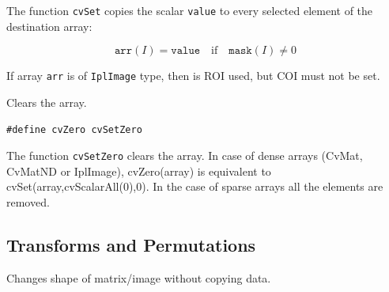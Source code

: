 \begin{description}
\end{description}


The function \texttt{cvSet} copies the scalar \texttt{value} to every selected element of the destination array:

\[
\texttt{arr}(I)=\texttt{value} \quad \text{if} \quad \texttt{mask}(I) \ne 0
\]

If array \texttt{arr} is of \texttt{IplImage} type, then is ROI used, but COI must not be set.

\label{SetZero}

Clears the array.


\begin{lstlisting}
#define cvZero cvSetZero
\end{lstlisting}

\begin{description}
\end{description}

The function \texttt{cvSetZero} clears the array. In case of dense arrays (CvMat, CvMatND or IplImage), cvZero(array) is equivalent to
cvSet(array,cvScalarAll(0),0).
In the case of sparse arrays all the elements are removed.

\subsection{Transforms and Permutations}

\label{Reshape}

Changes shape of matrix/image without copying data.


\begin{description}
\end{description}

